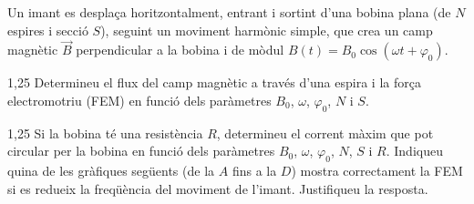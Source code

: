 Un imant es desplaça horitzontalment, entrant i sortint d'una bobina plana (de $N$ espires
i secció $S$), seguint un moviment harmònic simple, que crea un camp magnètic $\vec{B}$
perpendicular a la bobina i de mòdul $B(t) = B_0\cos(\omega t + \varphi_0)$.

\begin{apartat}{1,25}
Determineu el flux del camp magnètic a través d'una espira i la força electromotriu
(FEM) en funció dels paràmetres $B_0$, $\omega$, $\varphi_0$, $N$ i $S$.

\end{apartat}

\begin{apartat}{1,25}
Si la bobina té una resistència $R$, determineu el corrent màxim que pot circular per la
bobina en funció dels paràmetres $B_0$, $\omega$, $\varphi_0$, $N$, $S$ i $R$. Indiqueu
quina de les gràfiques següents (de la $A$ fins a la $D$) mostra correctament la FEM si es
redueix la freqüència del moviment de l'imant. Justifiqueu la resposta.

\end{apartat}

